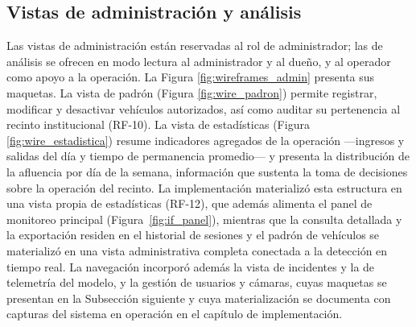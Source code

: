 \subsection{Vistas de administración y análisis}

Las vistas de administración están reservadas al rol de administrador; las de
análisis se ofrecen en modo lectura al administrador y al dueño, y al operador
como apoyo a la operación. La Figura \ref{fig:wireframes_admin} presenta sus
maquetas. La vista de padrón (Figura \ref{fig:wire_padron}) permite registrar,
modificar y desactivar vehículos autorizados, así como auditar su pertenencia al
recinto institucional (RF-10). La vista de estadísticas (Figura
\ref{fig:wire_estadistica}) resume indicadores agregados de la operación
---ingresos y salidas del día y tiempo de permanencia promedio--- y presenta la
distribución de la afluencia por día de la semana, información que sustenta la
toma de decisiones sobre la operación del recinto. La implementación materializó
esta estructura en una vista propia de estadísticas (RF-12), que además alimenta
el panel de monitoreo principal (Figura~\ref{fig:if_panel}), mientras que la
consulta detallada y la exportación residen en el historial de sesiones y el
padrón de vehículos se materializó en una vista administrativa completa
conectada a la detección en tiempo real. La navegación incorporó además la vista
de incidentes y la de telemetría del modelo, y la gestión de usuarios y cámaras,
cuyas maquetas se presentan en la Subsección siguiente y cuya materialización se
documenta con capturas del sistema en operación en el capítulo de implementación.

